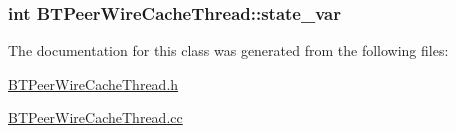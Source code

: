 \subsubsection[{state\+\_\+var}]{\setlength{\rightskip}{0pt plus 5cm}int B\+T\+Peer\+Wire\+Cache\+Thread\+::state\+\_\+var\hspace{0.3cm}{\ttfamily [protected]}}\label{classBTPeerWireCacheThread_ab0fe60bb80ce09de5bc14153075af0b7}


The documentation for this class was generated from the following files\+:\begin{DoxyCompactItemize}
\item 
\hyperlink{BTPeerWireCacheThread_8h}{B\+T\+Peer\+Wire\+Cache\+Thread.\+h}\item 
\hyperlink{BTPeerWireCacheThread_8cc}{B\+T\+Peer\+Wire\+Cache\+Thread.\+cc}\end{DoxyCompactItemize}
